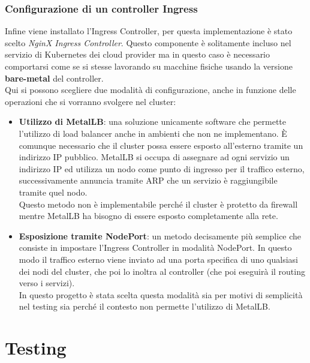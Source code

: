\documentclass[12pt,a4paper,openright,twoside]{book}
\begin{document}
\subsection{Configurazione di un controller Ingress}
\label{sec:ingress}
Infine viene installato l'Ingress Controller, per questa implementazione è stato scelto \textit{NginX Ingress Controller}. Questo componente è solitamente
incluso nel servizio di Kubernetes dei cloud provider ma in questo caso è necessario comportarsi come se si stesse lavorando su macchine fisiche usando la 
versione \textbf{bare-metal} del controller.\\
Qui si possono scegliere due modalità di configurazione, anche in funzione delle operazioni che si vorranno svolgere nel cluster\cite{nginx-ingress-controller}:
\begin{itemize}
    \item \textbf{Utilizzo di MetalLB}: una soluzione unicamente software che permette l'utilizzo di load balancer anche in ambienti che non ne implementano.
        È comunque necessario che il cluster possa essere esposto all'esterno tramite un indirizzo IP pubblico. MetalLB si occupa di assegnare ad ogni servizio un
        indirizzo IP ed utilizza un nodo come punto di ingresso per il traffico esterno, successivamente annuncia tramite ARP che un servizio è raggiungibile tramite 
        quel nodo.\\
        Questo metodo non è implementabile perché il cluster è protetto da firewall mentre MetalLB ha bisogno di essere esposto completamente alla rete.
    \item {\textbf{Esposizione tramite NodePort}: un metodo decisamente più semplice che consiste in impostare l'Ingress Controller in modalità NodePort.
        In questo modo il traffico esterno viene inviato ad una porta specifica di uno qualsiasi dei nodi del cluster, che poi lo inoltra al controller (che poi
        eseguirà il routing verso i servizi).\\
        In questo progetto è stata scelta questa modalità sia per motivi di semplicità nel testing sia perché il contesto non permette l'utilizzo di MetalLB.
    }
\end{itemize} 
\chapter{Testing}
\end{document}
